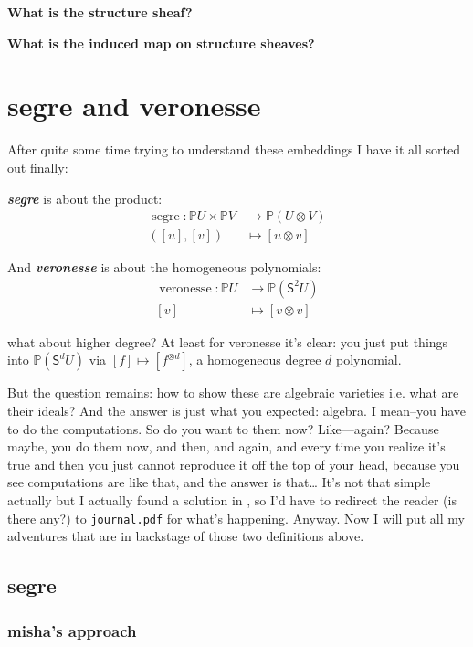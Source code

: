 \textbf{What is the structure sheaf?} 

\textbf{What is the induced map on structure sheaves?}

\section{segre and veronesse}

After quite some time trying to understand these embeddings I have it all sorted out finally:

\textit{\textbf{segre}} is about the product:
\begin{align*}
	\operatorname{s e g re}: \mathbb{P}U \times \mathbb{P}V &\longrightarrow \mathbb{P}(U \otimes V) \\
	([u],[v])&\longmapsto [u \otimes v]
\end{align*}

And \textit{\textbf{veronesse}} is about the homogeneous polynomials:
\begin{align*}
	\operatorname{ver o ne sse}: \mathbb{P}U &\longrightarrow \mathbb{P}(\mathsf{S}^2U) \\
	[v]&\longmapsto [v \otimes v]
\end{align*}

what about higher degree? At least for veronesse it's clear: you just put things into \(\mathbb{P}(\mathsf{S}^dU)\) via \([f] \mapsto [f^{\otimes d}]\), a homogeneous degree \(d\) polynomial.

But the question remains: how to show these are algebraic varieties i.e. what are their ideals? And the answer is just what you expected: algebra. I mean--you have to do the computations. So do you want to them now? Like---again? Because maybe, you do them now, and then, and again, and every time you realize it's true and then you just cannot reproduce it off the top of your head, because you see computations are like that, and the answer is that… It's not that simple actually but I actually found a solution in \cite{sysy}, so I'd have to redirect the reader (is there any?) to \texttt{journal.pdf} for what's happening. Anyway. Now I will put all my adventures that are in backstage of those two definitions above.
\subsection{segre}


\subsubsection{misha's approach}

